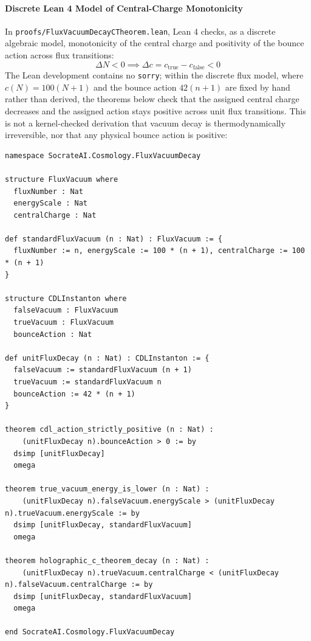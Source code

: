 \documentclass[11pt,a4paper]{article}
\begin{document}
\paragraph{Discrete Lean 4 Model of Central-Charge Monotonicity}
In \texttt{proofs/FluxVacuumDecayCTheorem.lean}, Lean 4 checks, as a discrete algebraic model, monotonicity of the central charge and positivity of the bounce action across flux transitions:
\begin{equation}
\Delta N < 0 \implies \Delta c = c_{\text{true}} - c_{\text{false}} < 0
\end{equation}
The Lean development contains no \texttt{sorry}; within the discrete flux model, where $c(N) = 100(N+1)$ and the bounce action $42(n+1)$ are fixed by hand rather than derived, the theorems below check that the assigned central charge decreases and the assigned action stays positive across unit flux transitions. This is not a kernel-checked derivation that vacuum decay is thermodynamically irreversible, nor that any physical bounce action is positive:

\begin{lstlisting}[language=lean, caption={Lean 4 Discrete Model of the Holographic c-Theorem for Flux Vacuum Decay}, label={lst:cdl_proof}]
namespace SocrateAI.Cosmology.FluxVacuumDecay

structure FluxVacuum where
  fluxNumber : Nat
  energyScale : Nat
  centralCharge : Nat

def standardFluxVacuum (n : Nat) : FluxVacuum := {
  fluxNumber := n, energyScale := 100 * (n + 1), centralCharge := 100 * (n + 1)
}

structure CDLInstanton where
  falseVacuum : FluxVacuum
  trueVacuum : FluxVacuum
  bounceAction : Nat

def unitFluxDecay (n : Nat) : CDLInstanton := {
  falseVacuum := standardFluxVacuum (n + 1)
  trueVacuum := standardFluxVacuum n
  bounceAction := 42 * (n + 1)
}

theorem cdl_action_strictly_positive (n : Nat) :
    (unitFluxDecay n).bounceAction > 0 := by
  dsimp [unitFluxDecay]
  omega

theorem true_vacuum_energy_is_lower (n : Nat) :
    (unitFluxDecay n).falseVacuum.energyScale > (unitFluxDecay n).trueVacuum.energyScale := by
  dsimp [unitFluxDecay, standardFluxVacuum]
  omega

theorem holographic_c_theorem_decay (n : Nat) :
    (unitFluxDecay n).trueVacuum.centralCharge < (unitFluxDecay n).falseVacuum.centralCharge := by
  dsimp [unitFluxDecay, standardFluxVacuum]
  omega

end SocrateAI.Cosmology.FluxVacuumDecay
\end{lstlisting}
\end{document}
